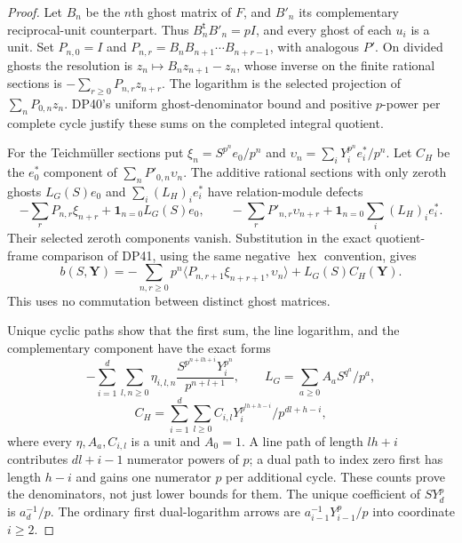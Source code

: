 \begin{proof}
Let $B_n$ be the $n$th ghost matrix of $F$, and $B'_n$ its complementary reciprocal-unit counterpart. Thus
$B_n^{\mathsf t}B'_n=pI$, and every ghost of each $u_i$ is a unit.
Set $P_{n,0}=I$ and
$P_{n,r}=B_nB_{n+1}\cdots B_{n+r-1}$, with analogous $P'$.
On divided ghosts the resolution is $z_n\mapsto B_nz_{n+1}-z_n$, whose inverse on the finite rational sections is
$-\sum_{r\ge0}P_{n,r}z_{n+r}$.
The logarithm is the selected projection of $\sum_nP_{0,n}z_n$.
DP40's uniform ghost-denominator bound and positive $p$-power per complete cycle justify these sums on the completed integral quotient.

For the Teichm\"uller sections put
$\xi_n=S^{p^n}e_0/p^n$ and
$\upsilon_n=\sum_iY_i^{p^n}e_i^*/p^n$.
Let $C_H$ be the $e_0^*$ component of $\sum_nP'_{0,n}\upsilon_n$.
The additive rational sections with only zeroth ghosts
$L_G(S)e_0$ and $\sum_i(L_H)_i e_i^*$ have relation-module defects
\[
 -\sum_rP_{n,r}\xi_{n+r}+\mathbf1_{n=0}L_G(S)e_0,\qquad
 -\sum_rP'_{n,r}\upsilon_{n+r}
       +\mathbf1_{n=0}\sum_i(L_H)_ie_i^*.
\]
Their selected zeroth components vanish. Substitution in the exact quotient-frame comparison of DP41, using the same negative $\operatorname{hex}$ convention, gives
\begin{equation}\label{eq:unitprimitive}
 b(S,\mathbf Y)=
 -\sum_{n,r\ge0}p^n
       \langle P_{n,r+1}\xi_{n+r+1},\upsilon_n\rangle
       +L_G(S)C_H(\mathbf Y).
\end{equation}
This uses no commutation between distinct ghost matrices.

Unique cyclic paths show that the first sum, the line logarithm, and the complementary component have the exact forms
\[
 -\sum_{i=1}^d\sum_{l,n\ge0}
   \eta_{i,l,n}\frac{S^{p^{n+lh+i}}Y_i^{p^n}}{p^{n+l+1}},\qquad
 L_G=\sum_{a\ge0}A_aS^{q^a}/p^a,
\]
\[
 C_H=\sum_{i=1}^d\sum_{l\ge0}
        C_{i,l}Y_i^{p^{lh+h-i}}/p^{dl+h-i},
\]
where every $\eta,A_a,C_{i,l}$ is a unit and $A_0=1$.
A line path of length $lh+i$ contributes $dl+i-1$ numerator powers of $p$; a dual path to index zero first has length $h-i$ and gains one numerator $p$ per additional cycle. These counts prove the denominators, not just lower bounds for them.
The unique coefficient of $SY_d^p$ is $a_d^{-1}/p$.
The ordinary first dual-logarithm arrows are
$a_{i-1}^{-1}Y_{i-1}^p/p$ into coordinate $i\ge2$.


\end{proof}
